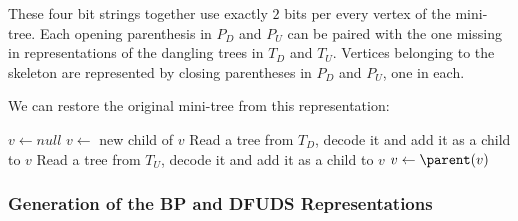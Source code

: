 These four bit strings together use exactly $2$ bits per every vertex of the mini-tree.
Each opening parenthesis in $P_D$ and $P_U$ can be paired with the one missing in representations of the dangling trees in $T_D$ and $T_U$.
Vertices belonging to the skeleton are represented by closing parentheses in $P_D$ and $P_U$, one in each.

We can restore the original mini-tree from this representation:
\begin{algorithm}
\begin{algorithmic}
\Function{\restore}{}
	\State $v \gets null$
		\State $v \gets$ new child of $v$
			\State Read a tree from $T_D$, decode it and add it as a child to $v$
		\EndWhile
	\EndWhile
			\State Read a tree from $T_U$, decode it and add it as a child to $v$
		\EndWhile
		\State $v \gets \parent(v)$
	\EndWhile
\EndFunction
\end{algorithmic}
\end{algorithm}

\subsubsection{Generation of the BP and DFUDS Representations}

